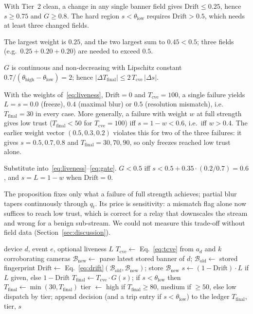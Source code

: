 \documentclass[journal]{IEEEtran}
\newcommand{\Tcve}{T_{\mathrm{cve}}}
\newcommand{\Tfin}{T_{\mathrm{final}}}
\newcommand{\thlo}{\theta_{\mathrm{low}}}
\newcommand{\thhi}{\theta_{\mathrm{high}}}
\newcommand{\Drift}{\mathrm{Drift}}
\begin{document}
\begin{proposition}
With Tier~2 clean, a change in any single banner field gives $\Drift\le 0.25$, hence $s\ge 0.75$ and $G\ge 0.8$. The hard region $s<\thlo$ requires $\Drift>0.5$, which needs at least three changed fields.
\end{proposition}
\begin{IEEEproof}
The largest weight is $0.25$, and the two largest sum to $0.45<0.5$; three fields (e.g.\ $0.25+0.20+0.20$) are needed to exceed $0.5$.
\end{IEEEproof}

\begin{proposition}
$G$ is continuous and non-decreasing with Lipschitz constant $0.7/(\thhi-\thlo)=2$; hence $|\Delta\Tfin|\le 2\,\Tcve\,|\Delta s|$.
\end{proposition}

\begin{proposition}
With the weights of~\eqref{eq:liveness}, $\Drift=0$ and $\Tcve=100$, a single failure yields $L=s=0.0$ (freeze), $0.4$ (maximal blur) or $0.5$ (resolution mismatch), i.e.\ $\Tfin=30$ in every case. More generally, a failure with weight $w$ at full strength gives low trust ($\Tfin<50$ for $\Tcve=100$) iff $s=1-w<0.6$, i.e.\ iff $w>0.4$. The earlier weight vector $(0.5,0.3,0.2)$ violates this for two of the three failures: it gives $s=0.5,0.7,0.8$ and $\Tfin=30,70,90$, so only freezes reached low trust alone.
\end{proposition}
\begin{IEEEproof}
Substitute into~\eqref{eq:liveness}--\eqref{eq:gate}. $G<0.5$ iff $s<0.5+0.35\cdot(0.2/0.7)=0.6$, and $s=L=1-w$ when $\Drift=0$.
\end{IEEEproof}
The proposition fixes only what a failure of full strength achieves; partial blur tapers continuously through $q_t$. Its price is sensitivity: a mismatch flag alone now suffices to reach low trust, which is correct for a relay that downscales the stream and wrong for a benign sub-stream. We could not measure this trade-off without field data (Section~\ref{sec:discussion}).

\begin{algorithm}[!t]
\caption{IG-DCTF scoring of a detection event}
\label{alg:igdctf}
\begin{algorithmic}[1]
\Require device $d$, event $e$, optional liveness $L$
\State $\Tcve\gets$ Eq.~\eqref{eq:tcve} from $a_d$ and $k$ corroborating cameras
\State $\mathcal{B}_{\mathrm{new}}\gets$ parse latest stored banner of $d$; $\mathcal{B}_{\mathrm{old}}\gets$ stored fingerprint
\State $\Drift\gets$ Eq.~\eqref{eq:drift}$(\mathcal{B}_{\mathrm{old}},\mathcal{B}_{\mathrm{new}})$; store $\mathcal{B}_{\mathrm{new}}$
\State $s\gets(1-\Drift)\cdot L$ if $L$ given, else $1-\Drift$
\State $\Tfin\gets\Tcve\cdot G(s)$; if $s<\thlo$ then $\Tfin\gets\min(30,\Tfin)$
\State tier $\gets$ high if $\Tfin\ge 80$, medium if $\ge 50$, else low
\State dispatch by tier; append decision (and a trip entry if $s<\thlo$) to the ledger
\State \Return $\Tfin$, tier, $s$
\end{algorithmic}
\end{algorithm}
\end{document}
